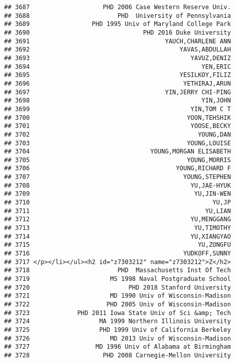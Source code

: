\documentclass[
]{article}
\begin{document}
\begin{verbatim}
## 3687                    PHD 2006 Case Western Reserve Univ.
## 3688                        PHD  University of Pennsylvania
## 3689                 PHD 1995 Univ of Maryland College Park
## 3690                               PHD 2016 Duke University
## 3691                                     YAUCH,CHARLENE ANN
## 3692                                         YAVAS,ABDULLAH
## 3693                                            YAVUZ,DENIZ
## 3694                                               YEN,ERIC
## 3695                                         YESILKOY,FILIZ
## 3696                                          YETHIRAJ,ARUN
## 3697                                     YIN,JERRY CHI-PING
## 3698                                               YIN,JOHN
## 3699                                            YIN,TOM C T
## 3700                                           YOON,TEHSHIK
## 3701                                            YOOSE,BECKY
## 3702                                              YOUNG,DAN
## 3703                                           YOUNG,LOUISE
## 3704                                 YOUNG,MORGAN ELISABETH
## 3705                                           YOUNG,MORRIS
## 3706                                        YOUNG,RICHARD F
## 3707                                          YOUNG,STEPHEN
## 3708                                            YU,JAE-HYUK
## 3709                                             YU,JIN-WEN
## 3710                                                  YU,JP
## 3711                                                YU,LIAN
## 3712                                            YU,MENGGANG
## 3713                                             YU,TIMOTHY
## 3714                                            YU,XIANGYAO
## 3715                                              YU,ZONGFU
## 3716                                          YUDKOFF,SUNNY
## 3717 </p></li></ul><h2 id="z7303212" name="z7303212">Z</h2>
## 3718                        PHD  Massachusetts Inst Of Tech
## 3719                      MS 1998 Naval Postgraduate School
## 3720                           PHD 2018 Stanford University
## 3721                      MD 1990 Univ of Wisconsin-Madison
## 3722                     PHD 2005 Univ of Wisconsin-Madison
## 3723             PHD 2011 Iowa State Univ of Sci &amp; Tech
## 3724                   MA 1999 Northern Illinois University
## 3725                   PHD 1999 Univ of California Berkeley
## 3726                      MD 2013 Univ of Wisconsin-Madison
## 3727                  MD 1996 Univ of Alabama at Birmingham
## 3728                    PHD 2008 Carnegie-Mellon University

\end{verbatim}
\end{document}
